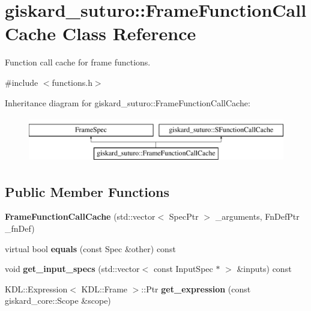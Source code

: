\hypertarget{classgiskard__suturo_1_1FrameFunctionCallCache}{\section{giskard\-\_\-suturo\-:\-:Frame\-Function\-Call\-Cache Class Reference}
\label{classgiskard__suturo_1_1FrameFunctionCallCache}
}


Function call cache for frame functions.  




{\ttfamily \#include $<$functions.\-h$>$}

Inheritance diagram for giskard\-\_\-suturo\-:\-:Frame\-Function\-Call\-Cache\-:\begin{figure}[H]
\begin{center}
\leavevmode
\includegraphics[height=2.000000cm]{classgiskard__suturo_1_1FrameFunctionCallCache}
\end{center}
\end{figure}
\subsection*{Public Member Functions}
\begin{DoxyCompactItemize}
\item 
\hypertarget{classgiskard__suturo_1_1FrameFunctionCallCache_aaf8212b31b7f566c96be7192e2fc5e78}{{\bfseries Frame\-Function\-Call\-Cache} (std\-::vector$<$ Spec\-Ptr $>$ \-\_\-arguments, Fn\-Def\-Ptr \-\_\-fn\-Def)}\label{classgiskard__suturo_1_1FrameFunctionCallCache_aaf8212b31b7f566c96be7192e2fc5e78}

\item 
\hypertarget{classgiskard__suturo_1_1FrameFunctionCallCache_a62f4cc3a3ae7aea67ac9e5f60d85926c}{virtual bool {\bfseries equals} (const Spec \&other) const }\label{classgiskard__suturo_1_1FrameFunctionCallCache_a62f4cc3a3ae7aea67ac9e5f60d85926c}

\item 
\hypertarget{classgiskard__suturo_1_1FrameFunctionCallCache_a10a2a519997b06ed7a35ae44e2540180}{void {\bfseries get\-\_\-input\-\_\-specs} (std\-::vector$<$ const Input\-Spec $\ast$ $>$ \&inputs) const }\label{classgiskard__suturo_1_1FrameFunctionCallCache_a10a2a519997b06ed7a35ae44e2540180}

\item 
\hypertarget{classgiskard__suturo_1_1FrameFunctionCallCache_a953ea6676e6ef0904b014c546c5b1fec}{K\-D\-L\-::\-Expression$<$ K\-D\-L\-::\-Frame $>$\-::Ptr {\bfseries get\-\_\-expression} (const giskard\-\_\-core\-::\-Scope \&scope)}\label{classgiskard__suturo_1_1FrameFunctionCallCache_a953ea6676e6ef0904b014c546c5b1fec}

\end{DoxyCompactItemize}
